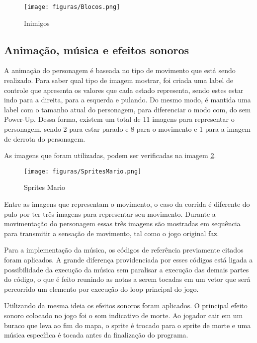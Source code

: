 \documentclass[11pt, twocolumn]{extarticle}
\begin{document}
\begin{figure}[H]
	\centering
	\texttt{[image: figuras/Blocos.png]}
	\caption{Inimigos}
	\label{image: Inimigos}
\end{figure}


\subsection{Animação, música e efeitos sonoros}
\indent \indent A animação do personagem é baseada no tipo de movimento que está sendo realizado. Para saber qual tipo de imagem mostrar, foi criada uma label de controle que apresenta os valores que cada estado representa, sendo estes estar indo para a direita, para a esquerda e pulando. Do mesmo modo, é mantida uma label com o tamanho atual do personagem, para diferenciar o modo com, do sem Power-Up. Dessa forma, existem um total de 11 imagens para representar o personagem, sendo 2 para estar parado e 8 para o movimento e 1 para a imagem de derrota do personagem.

As imagens que foram utilizadas, podem ser verificadas na imagem \ref{image: Sprites Mario}.

\begin{figure}[H]
	\centering
	\texttt{[image: figuras/SpritesMario.png]}
	\caption{Sprites Mario}
	\label{image: Sprites Mario}
\end{figure}

Entre as imagens que representam o movimento, o caso da corrida é diferente do pulo por ter três imagens para representar seu movimento. Durante a movimentação do personagem essas três imagens são mostradas em sequência para transmitir a sensação de movimento, tal como o jogo original faz. 

Para a implementação da música, os códigos de referência previamente citados foram aplicados. A grande diferença providenciada por esses códigos está ligada a possibilidade da execução da música sem paralisar a execução das demais partes do código, o que é feito reunindo as notas a serem tocadas em um vetor que será percorrido um elemento por execução do loop principal do jogo.

Utilizando da mesma ideia os efeitos sonoros foram aplicados. O principal efeito sonoro colocado no jogo foi o som indicativo de morte. Ao jogador cair em um buraco que leva ao fim do mapa, o sprite é trocado para o sprite de morte e uma música específica é tocada antes da finalização do programa.
\end{document}
